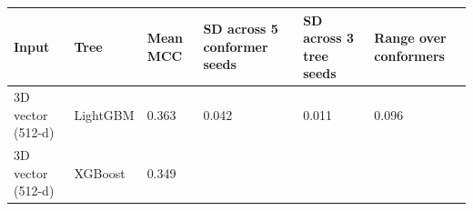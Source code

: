 \documentclass[
  10pt,
]{article}
\begin{document}
\begin{longtable}[]{@{}llllll@{}}
\toprule
\begin{minipage}[b]{0.14\columnwidth}\raggedright
Input\strut
\end{minipage} & \begin{minipage}[b]{0.14\columnwidth}\raggedright
Tree\strut
\end{minipage} & \begin{minipage}[b]{0.14\columnwidth}\raggedright
Mean MCC\strut
\end{minipage} & \begin{minipage}[b]{0.14\columnwidth}\raggedright
SD across 5 conformer seeds\strut
\end{minipage} & \begin{minipage}[b]{0.14\columnwidth}\raggedright
SD across 3 tree seeds\strut
\end{minipage} & \begin{minipage}[b]{0.14\columnwidth}\raggedright
Range over conformers\strut
\end{minipage}\tabularnewline
\midrule
\endhead
\begin{minipage}[t]{0.14\columnwidth}\raggedright
3D vector (512-d)\strut
\end{minipage} & \begin{minipage}[t]{0.14\columnwidth}\raggedright
LightGBM\strut
\end{minipage} & \begin{minipage}[t]{0.14\columnwidth}\raggedright
0.363\strut
\end{minipage} & \begin{minipage}[t]{0.14\columnwidth}\raggedright
0.042\strut
\end{minipage} & \begin{minipage}[t]{0.14\columnwidth}\raggedright
0.011\strut
\end{minipage} & \begin{minipage}[t]{0.14\columnwidth}\raggedright
0.096\strut
\end{minipage}\tabularnewline
\begin{minipage}[t]{0.14\columnwidth}\raggedright
3D vector (512-d)\strut
\end{minipage} & \begin{minipage}[t]{0.14\columnwidth}\raggedright
XGBoost\strut
\end{minipage} & \begin{minipage}[t]{0.14\columnwidth}\raggedright
0.349\strut
\end{minipage} & \begin{minipage}[t]{0.14\columnwidth}\raggedright

\end{minipage}
\end{longtable}
\end{document}
